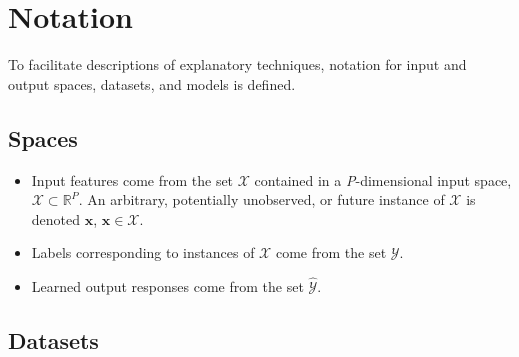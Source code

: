 \documentclass[sigconf]{acmart}
\begin{document}
\section{Notation} \label{sec:notation}

To facilitate descriptions of explanatory techniques, notation for input and output spaces, datasets, and models is defined.

\subsection{Spaces} 
 
	\begin{itemize}
		\item Input features come from the set $\mathcal{X}$ contained in a \textit{P}-dimensional input space, $\mathcal{X} \subset \mathbb{R}^P$.  An arbitrary, potentially unobserved, or future instance of $\mathcal{X}$ is denoted $\mathbf{x}$, $\mathbf{x} \in \mathcal{X}$.
		\item Labels corresponding to instances of $\mathcal{X}$ come from the set $\mathcal{Y}$.
		\item Learned output responses come from the set $\mathcal{\hat{Y}}$. %
	\end{itemize}	
	
\subsection{Datasets} 
\end{document}
